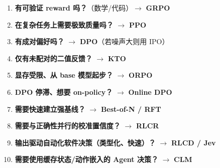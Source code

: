 \begin{keybox}
\begin{enumerate}
  \item \textbf{有可验证 reward 吗？}（数学/代码）$\rightarrow$ \textbf{GRPO}
  \item \textbf{在复杂任务上需要极致质量吗？} $\rightarrow$ \textbf{PPO}
  \item \textbf{有成对偏好吗？} $\rightarrow$ \textbf{DPO}（若噪声大则用 IPO）
  \item \textbf{仅有未配对的二值反馈？} $\rightarrow$ \textbf{KTO}
  \item \textbf{显存受限、从 base 模型起步？} $\rightarrow$ \textbf{ORPO}
  \item \textbf{DPO 停滞、想要 on-policy？} $\rightarrow$ \textbf{Online DPO}
  \item \textbf{需要快速建立强基线？} $\rightarrow$ \textbf{Best-of-N / RFT}
  \item \textbf{需要与正确性并行的校准置信度？} $\rightarrow$ \textbf{RLCR}
  \item \textbf{输出驱动自动化软件决策（类型化、快速）？} $\rightarrow$ \textbf{RLCD / Jev}
  \item \textbf{需要使用缓存状态/动作嵌入的 Agent 决策？} $\rightarrow$ \textbf{CLM}
\end{enumerate}
\end{keybox}

